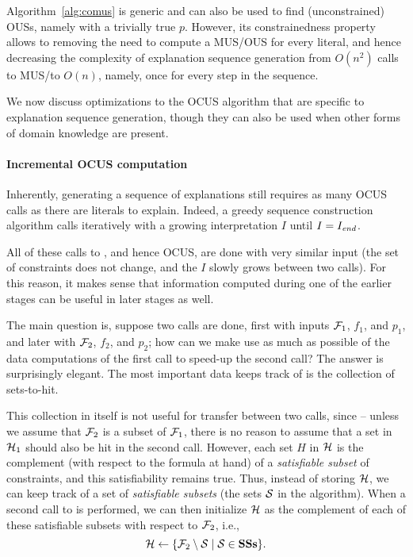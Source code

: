 Algorithm~\ref{alg:comus} is generic and can also be used to find (unconstrained) OUSs, namely with a trivially true $p$.
However, its constrainedness property allows to removing the need to compute a MUS/OUS for every literal, and hence decreasing the complexity of explanation sequence generation from $O(n^2)$ calls to MUS/\omus to $O(n)$, namely, once for every step in the sequence. 

We now discuss optimizations to the OCUS algorithm that are specific to explanation sequence generation, though they can also be used when other forms of domain knowledge are present. 
 
\paragraph{Incremental OCUS computation}
Inherently, generating a sequence of explanations still requires as many OCUS calls as there are literals to explain. 
Indeed, a greedy sequence construction algorithm %
calls \onestepo iteratively with a growing interpretation $I$ until $I=I_\mathit{end} $.

All of these calls to \onestepo, and hence OCUS, are done with very similar input (the set of constraints does not change, and the $I$ slowly grows between two calls). For this reason, it makes sense that information computed during one of the earlier stages can be useful in later stages as well. 

The main question is, suppose two \comus calls are done, first with inputs $\mathcal{F} _1$, $f_1$, and $p_1$, and later with $\mathcal{F} _2$, $f_2$, and $p_2$; how can we make use as much as possible of the data computations of the first call to speed-up the second call? The answer is surprisingly elegant. The most important data \comus keeps track of  is the collection \setstohit of sets-to-hit.

This collection in itself is not useful for transfer between two calls, since -- unless we assume that $\mathcal{F} _2$ is a subset of $\mathcal{F} _1$, there is no reason to assume that a set in $\mathcal{H}_1$ should also be hit in the second call. 
However, each set $H$ in $\mathcal{H}$ is the complement (with respect to the formula at hand) of a \emph{satisfiable subset} of constraints, and this satisfiability remains true. 
Thus, instead of storing $\mathcal{H}$, we can keep track of a set \satsets of \emph{satisfiable subsets} (the sets $\mathcal{S}$ in the \comus algorithm). 
When a second call to \comus is performed, we can then initialize $\mathcal{H}$ as the complement of each of these satisfiable subsets with respect to $\mathcal{F} _2$, i.e., \[\mathcal{H}\gets \{\mathcal{F} _2\setminus \mathcal{S}\mid \mathcal{S}\in \mathbf{SSs}\}.\]

